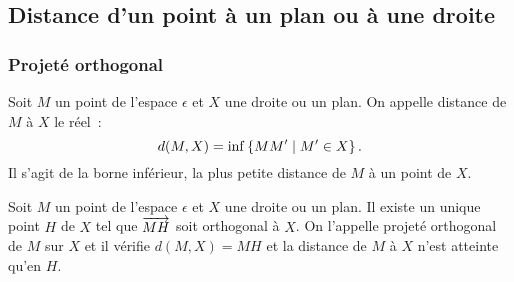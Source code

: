 \subsection{Distance d'un point à un plan ou à une droite}
\subsubsection{Projeté orthogonal}
\begin{defdef}
  Soit \(M\) un point de l'espace \(\epsilon\) et \(X\) une droite ou un plan.  
  On appelle distance de \(M\) à \(X\) le réel~:
  \begin{equation}
    d(M, X)=\operatorname{inf}\left\{MM'\mathrel{}\middle|\mathrel{}M' \in X\right\}.
  \end{equation}
  Il s'agit de la borne inférieur, la plus petite distance de \(M\) à un point 
  de \(X\).
\end{defdef}

\begin{prop}
  Soit \(M\) un point de l'espace \(\epsilon\) et \(X\) une droite ou un plan.  
  Il existe un unique point \(H\) de \(X\) tel que \(\overrightarrow{MH}\) soit 
  orthogonal à \(X\). On l'appelle projeté orthogonal de \(M\) sur \(X\) et il 
  vérifie \(d(M, X) = MH\) et la distance de \(M\) à \(X\) n'est atteinte qu'en 
  \(H\).
\end{prop}

